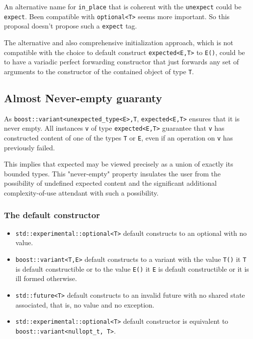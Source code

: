 \documentclass[a4paper,10pt]{article}
\newcommand{\cpp}[1]{\lstinline{#1}}
\begin{document}
An alternative name for \cpp{in_place} that is coherent with the \cpp{unexpect} could be \cpp{expect}. Been compatible with \cpp{optional<T>} seems more important. So this proposal doesn't propose such a \cpp{expect} tag.

The alternative and also comprehensive initialization approach, which is not compatible with the choice to default construct \cpp{expected<E,T>} to \cpp{E()}, could be to have a variadic perfect forwarding constructor that just forwards any set of arguments to the constructor of the contained object of type \cpp{T}. 
 
\subsection{Almost Never-empty guaranty}

As \cpp{boost::variant<unexpected_type<E>,T}, \cpp{expected<E,T>} ensures that it is never empty.
All instances \cpp{v} of type \cpp{expected<E,T>} guarantee that \cpp{v} has constructed content of one of the types \cpp{T} or \cpp{E}, even if an operation on \cpp{v} has previously failed.

This implies that expected may be viewed precisely as a union of exactly its bounded types. This "never-empty" property insulates the user from the possibility of undefined expected content and the significant additional complexity-of-use attendant with such a possibility.

\subsubsection{The default constructor}

\begin{itemize}
\item \cpp{std::experimental::optional<T>} default constructs to an optional with no value. 
\item \cpp{boost::variant<T,E>} default constructs to a variant with the value \cpp{T()} it \cpp{T} is default constructible or to the value \cpp{E()} it \cpp{E} is default constructible or it is ill formed otherwise. 
\item \cpp{std::future<T>} default constructs to an invalid future with no shared state associated, that is, no value and no exception.
\item \cpp{std::experimental::optional<T>} default constructor is equivalent to \cpp{boost::variant<nullopt_t, T>}.
\end{itemize}
\end{document}
